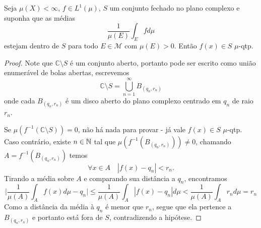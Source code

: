\begin{problem}
    \label{prob:l6:2}
    Seja $\mu(X) < \infty$, $f \in L^1(\mu)$, $S$ um conjunto fechado no plano complexo e suponha que as médias
    $$\frac{1}{\mu(E)} \int_E fd\mu$$
    estejam dentro de $S$ para todo $E \in \mathcal{M}$ com $\mu(E) > 0$. Então $f(x) \in S$ $\mu$-qtp. 
\end{problem}
\begin{proof}
    Note que $\mathbb{C} \setminus S$ é um conjunto aberto, portanto pode ser escrito como união enumerável
    de bolas abertas, escrevemos
    $$\mathbb{C} \setminus S = \bigcup_{n=1}^{\infty} B_{(q_n, r_n)}$$
    onde cada $B_{(q_n,r_n)}$ é um disco aberto do plano complexo centrado em $q_n$ de raio $r_n$. 
    
    Se $\mu(f^{-1}(\mathbb{C} \setminus S)) = 0$, não há nada para provar - já vale $f(x) \in S$ $\mu$-qtp. Caso contrário,
    existe $n \in \mathbb{N}$ tal que $\mu(f^{-1}(B_{(q_n,r_n)})) \neq 0$, chamando $A = f^{-1}(B_{(q_n,r_n)})$ temos
    $$\forall x \in A \quad |f(x) - q_n| < r_n.$$ 
    Tirando a média sobre $A$ e comparando sua distância a $q_n$, encontramos
    $$\bigg | \frac{1}{\mu(A)} \int_A f(x) d\mu - q_n\bigg| \leq \frac{1}{\mu(A)} \int_A |f(x) - q_n| d\mu < \frac{1}{\mu(A)} \int_A r_n d\mu = r_n$$
    Como a distância da média à $q_n$ é menor que $r_n$, segue que ela pertence a $B_{(q_n,r_n)}$ e portanto está fora de $S$, contradizendo a hipótese.
\end{proof}

\begin{problem}
    \label{prob:l6:3}
\end{problem}

\begin{problem}
    \label{prob:l6:4}
\end{problem}

